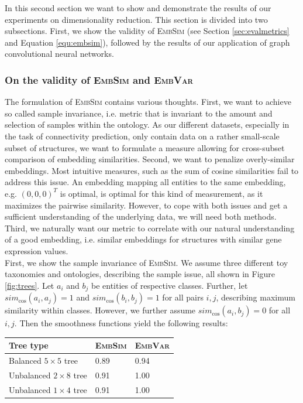 \documentclass[]{article}
\begin{document}
In this second section we want to show and demonstrate the results of our experiments on dimensionality reduction. This section is divided into two subsections. First, we show the validity of \textsc{EmbSim} (see Section \ref{sec:evalmetrics} and Equation \ref{equ:embsim}), followed by the results of our application of graph convolutional neural networks.

\subsubsection{On the validity of \textsc{EmbSim} and \textsc{EmbVar}}
\label{sec:results_embsim}

The formulation of \textsc{EmbSim} contains various thoughts. First, we want to achieve so called sample invariance, i.e. metric that is invariant to the amount and selection of samples within the ontology. As our different datasets, especially in the task of connectivity prediction, only contain data on a rather small-scale subset of structures, we want to formulate a measure allowing for cross-subset comparison of embedding similarities. 
Second, we want to penalize overly-similar embeddings. Most intuitive measures, such as the sum of cosine similarities fail to address this issue. An embedding mapping all entities to the same embedding, e.g. $(0,0,0)^T$ is optimal, is optimal for this kind of measurement, as it maximizes the pairwise similarity. However, to cope with both issues and get a sufficient understanding of the underlying data, we will need both methods. Third, we naturally want our metric to correlate with our natural understanding of a good embedding, i.e. similar embeddings for structures with similar gene expression values.\\

First, we show the sample invariance of \textsc{EmbSim}. We assume three different toy taxonomies and ontologies, describing the sample issue, all shown in Figure \ref{fig:trees}. Let $a_i $  and $b_j$ be entities of respective classes. Further, let $sim_\text{cos}(a_i, a_j)=1$ and $sim_\text{cos}(b_i, b_j)=1$ for all pairs $i,j$, describing maximum similarity within classes. However, we further assume $sim_\text{cos}(a_i, b_j)=0$ for all $i,j$. Then the smoothness functions yield the following results:\\

{
\centering
\renewcommand{\arraystretch}{1.5}
\begin{tabular}{l|ll}
	Tree type& \textsc{EmbSim} & \textsc{EmbVar}\\
	\hline
	Balanced $5\times 5$ tree&0.89&0.94\\
	Unbalanced $2\times 8$ tree&0.91&1.00\\
	Unbalanced $1\times 4$ tree&0.91&1.00\\
\end{tabular}
}\\
\end{document}

